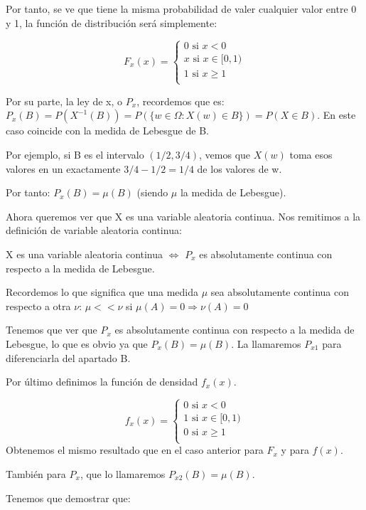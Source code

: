 \begin{problem}[1]
Por tanto, se ve que tiene la misma probabilidad de valer cualquier valor entre 0 y 1, la función de distribución será simplemente:

$$
F_x(x) =
  \left\lbrace
  \begin{array}{l}
     0 \text{ si } x < 0\\
     x \text{ si } x \in [0,1) \\
     1 \text{ si } x \geq 1 \\
  \end{array}
  \right.
$$

Por su parte, la ley de x, o $P_x$, recordemos que es:
$P_x(B) = P(X^{-1}(B)) = P(\{w \in \Omega : X(w) \in B\})=P(X \in B)$. En este caso coincide con la medida de Lebesgue de B.

Por ejemplo, si B es el intervalo $(1/2, 3/4)$, vemos que $X(w)$ toma esos valores en un exactamente $3/4-1/2=1/4$ de los valores de w.

Por tanto: $P_x(B)=\mu(B)$ (siendo $\mu$ la medida de Lebesgue).

Ahora queremos ver que X es una variable aleatoria continua. Nos remitimos a la definición de variable aleatoria continua:

X es una variable aleatoria continua $\Leftrightarrow$ $P_x$ es absolutamente continua con respecto a la medida de Lebesgue.

Recordemos lo que significa que una medida $\mu$ sea absolutamente continua con respecto a otra $\nu$:  $\mu << \nu$ si $\mu(A)=0 \Rightarrow \nu(A)=0$

Tenemos que ver que $P_x$ es absolutamente continua con respecto a la medida de Lebesgue, lo que es obvio ya que $P_x(B)=\mu(B)$. La llamaremos $P_{x1}$ para diferenciarla del apartado B.

Por último definimos la función de densidad $f_x(x)$.

$$
f_x(x) =
  \left\lbrace
  \begin{array}{l}
     0 \text{ si } x < 0\\
     1 \text{ si } x \in [0,1) \\
     0 \text{ si } x \geq 1 \\
  \end{array}
  \right.
$$
\spart
Obtenemos el mismo resultado que en el caso anterior para $F_x$ y para $f(x)$.

También para $P_x$, que lo llamaremos $P_{x2}(B)=\mu(B)$.


\spart 

Tenemos que demostrar que:


\end{problem}
